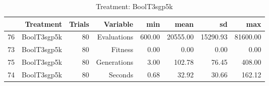 \begin{table}[ht]
\centering
\begin{tabular}{rrrrrrrr}
  \hline
 & Treatment & Trials & Variable & min & mean & sd & max \\ 
  \hline
76 & BoolT3sgp5k &  80 & Evaluations & 600.00 & 20555.00 & 15290.93 & 81600.00 \\ 
  73 & BoolT3sgp5k &  80 & Fitness & 0.00 & 0.00 & 0.00 & 0.00 \\ 
  75 & BoolT3sgp5k &  80 & Generations & 3.00 & 102.78 & 76.45 & 408.00 \\ 
  74 & BoolT3sgp5k &  80 & Seconds & 0.68 & 32.92 & 30.66 & 162.12 \\ 
   \hline
\end{tabular}
\caption{Treatment: BoolT3sgp5k} 
\end{table}
